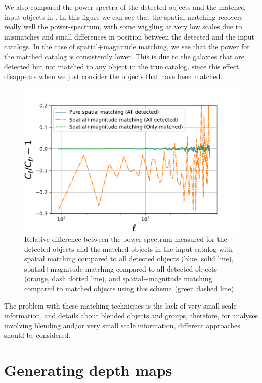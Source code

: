 \documentclass[\docopts]{\docclass}
\begin{document}
We also compared the power-spectra of the detected objects and the matched input objects in . In this figure we can see that the spatial matching recovers really well the power-spectrum, with some wiggling at very low scales due to mismatches and small differences in position between the detected and the input catalogs. In the case of spatial+magnitude matching, we see that the power for the matched catalog is consistently lower. This is due to the galaxies that are detected but not matched to any object in the true catalog, since this effect disappears when we just consider the objects that have been matched.

\begin{figure}
\centering
\includegraphics[width=0.9\columnwidth]{cl_comparison_matching.pdf}
\caption{Relative difference between the power-spectrum measured for the detected objects and the matched objects in the input catalog with spatial matching compared to all detected objects (blue, solid line), spatial+magnitude matching compared to all detected objects (orange, dash dotted line), and spatial+magnitude matching compared to matched objects using this schema (green dashed line).}
\label{fig:matching_cls}
\end{figure}
 
The problem with these matching techniques is the lack of very small scale information, and details about blended objects and groups, therefore, for analyses involving blending and/or very small scale information, different approaches should be considered. 
 

\section{Generating depth maps}
\label{sec:masking}
\end{document}
